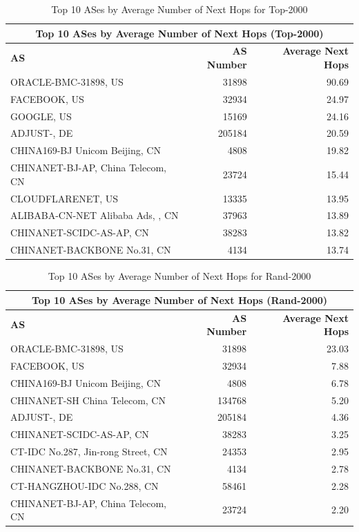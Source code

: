 \documentclass[12pt]{cwru_thesis}
\begin{document}
\begin{table}[h!]
    \centering
    \begin{tabularx}{\textwidth}{|X|r|r|}
        \hline
        \multicolumn{3}{|c|}{\textbf{Top 10 ASes by Average Number of Next Hops (Top-2000)}} \\
        \hline
        \textbf{AS} & \textbf{AS Number} & \textbf{Average Next Hops} \\
        \hline
        ORACLE-BMC-31898, US & 31898 & 90.69 \\
        FACEBOOK, US & 32934 & 24.97 \\
        GOOGLE, US & 15169 & 24.16 \\
        ADJUST-, DE & 205184 & 20.59 \\
        CHINA169-BJ Unicom Beijing, CN & 4808 & 19.82 \\
        CHINANET-BJ-AP, China Telecom, CN & 23724 & 15.44 \\
        CLOUDFLARENET, US & 13335 & 13.95 \\
        ALIBABA-CN-NET Alibaba Ads, , CN & 37963 & 13.89 \\
        CHINANET-SCIDC-AS-AP, CN & 38283 & 13.82 \\
        CHINANET-BACKBONE No.31, CN & 4134 & 13.74 \\
        \hline
    \end{tabularx}
    \caption{Top 10 ASes by Average Number of Next Hops for Top-2000}
    \label{tab:top2000_as_next_hops}
\end{table}

\begin{table}[h!]
    \centering
    \begin{tabularx}{\textwidth}{|X|r|r|}
        \hline
        \multicolumn{3}{|c|}{\textbf{Top 10 ASes by Average Number of Next Hops (Rand-2000)}} \\
        \hline
        \textbf{AS} & \textbf{AS Number} & \textbf{Average Next Hops} \\
        \hline
        ORACLE-BMC-31898, US & 31898 & 23.03 \\
        FACEBOOK, US & 32934 & 7.88 \\
        CHINA169-BJ Unicom Beijing, CN & 4808 & 6.78 \\
        CHINANET-SH China Telecom, CN & 134768 & 5.20 \\
        ADJUST-, DE & 205184 & 4.36 \\
        CHINANET-SCIDC-AS-AP, CN & 38283 & 3.25 \\
        CT-IDC No.287, Jin-rong Street, CN & 24353 & 2.95 \\
        CHINANET-BACKBONE No.31, CN & 4134 & 2.78 \\
        CT-HANGZHOU-IDC No.288, CN & 58461 & 2.28 \\
        CHINANET-BJ-AP, China Telecom, CN & 23724 & 2.20 \\
        \hline
    \end{tabularx}
    \caption{Top 10 ASes by Average Number of Next Hops for Rand-2000}
    \label{tab:rand2000_as_next_hops}
\end{table}
\end{document}
